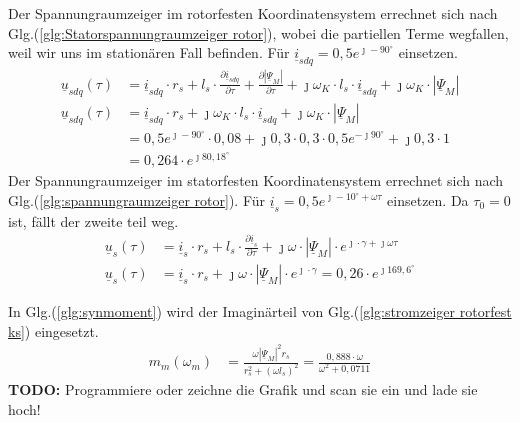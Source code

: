 \begin{solution}
\begin{compactenum}
\item Der Spannungraumzeiger im rotorfesten Koordinatensystem errechnet sich nach Glg.(\ref{glg:Statorspannungraumzeiger rotor}), wobei die partiellen Terme wegfallen, weil wir uns im stationären Fall befinden. Für $\underline{i}_{sdq}= 0,5 e^{\jmath -90^\circ}$ einsetzen.
\begin{align}
\underline{u}_{sdq}(\tau) &= \underline{i}_{sdq} \cdot r_s + l_s \cdot \frac{\partial \underline{i}_{sdq}}{\partial \tau} + \frac{\partial |\underline{\Psi}_M|}{\partial \tau} + \jmath \omega_K \cdot l_s \cdot \underline{i}_{sdq} + \jmath \omega_K \cdot |\underline{\Psi}_M|\\
\underline{u}_{sdq}(\tau) &= \underline{i}_{sdq} \cdot r_s + \jmath \omega_K \cdot l_s \cdot \underline{i}_{sdq} + \jmath \omega_K \cdot |\underline{\Psi}_M|\\
&= 0,5 e^{\jmath -90^\circ} \cdot 0,08 + \jmath 0,3 \cdot 0,3 \cdot 0,5 e^{-\jmath 90^\circ}+\jmath 0,3 \cdot 1\\
&=0,264 \cdot e^{\jmath 80,18^\circ}
\end{align}
Der Spannungraumzeiger im statorfesten Koordinatensystem errechnet sich nach Glg.(\ref{glg:spannungraumzeiger rotor}). Für $\underline{i}_{s}= 0,5 e^{\jmath -10^\circ+\omega \tau}$ einsetzen. Da $\tau_0 = 0$ ist, fällt der zweite teil weg.
\begin{align}
\underline{u}_s(\tau) &= \underline{i}_s \cdot r_s + l_s \cdot \frac{\partial \underline{i}_s}{\partial \tau} + \jmath\omega \cdot|\underline{\Psi}_M | \cdot e^{\jmath \cdot \gamma + \jmath \omega \tau}\\
\underline{u}_s(\tau) &= \underline{i}_s \cdot r_s + \jmath\omega \cdot|\underline{\Psi}_M | \cdot e^{\jmath \cdot \gamma}=0,26\cdot e^{\jmath 169,6^\circ}
\end{align}
\item In Glg.(\ref{glg:synmoment}) wird der Imaginärteil von Glg.(\ref{glg:stromzeiger rotorfest ks}) eingesetzt.
\begin{align}
m_m(\omega_m) &= \frac{\omega |\underline{\Psi}_M|^2 r_s}{r_s^2 + (\omega l_s)^2}=\frac{0,888 \cdot \omega}{\omega^2 + 0,0711}
\end{align}
\textbf{TODO:} Programmiere oder zeichne die Grafik und scan sie ein und lade sie hoch!
\end{compactenum}
\end{solution}